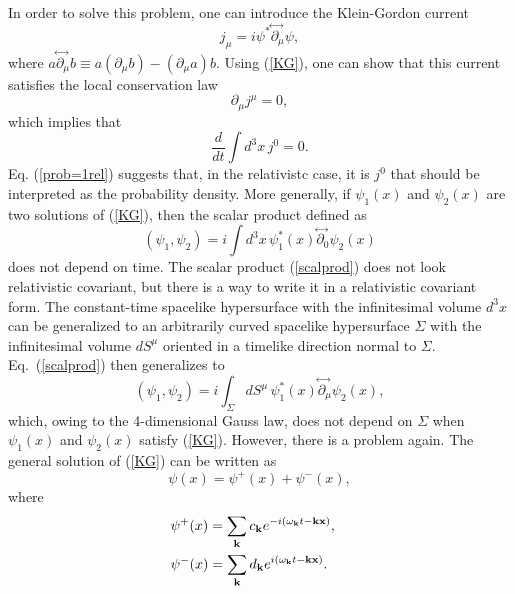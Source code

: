 \documentclass[12pt]{article}
\begin{document}
In order to solve this problem, one can introduce the 
Klein-Gordon current
\begin{equation}\label{cur}
j_{\mu}=i\psi^* \!\stackrel{\leftrightarrow\;}{\partial_{\mu}}\! \psi ,
\end{equation}
where $a \!\stackrel{\leftrightarrow\;}{\partial_{\mu}}\! b \equiv
a(\partial_{\mu}b) -(\partial_{\mu} a)b$.
Using (\ref{KG}), one can show that this current satisfies the 
local conservation law
\begin{equation}
\partial_{\mu}j^{\mu}=0,
\end{equation}     
which implies that
\begin{equation}\label{prob=1rel}
\frac{d}{dt}\int d^3x\, j^0 =0 .
\end{equation}
Eq. (\ref{prob=1rel}) suggests that, in the relativistc case, 
it is $j^0$ that should be interpreted as the probability density.
More generally, if $\psi_1(x)$ and $\psi_2(x)$ are two solutions
of (\ref{KG}), then the scalar product defined as
\begin{equation}\label{scalprod}
(\psi_1,\psi_2)=i\int d^3x \, \psi_1^*(x)
\!\stackrel{\leftrightarrow\;}{\partial_0}\! \psi_2(x) 
\end{equation} 
does not depend on time. The scalar product (\ref{scalprod})
does not look relativistic covariant, but there is a way to 
write it in a relativistic covariant form. The constant-time
spacelike 
hypersurface with the infinitesimal volume $d^3x$ can be generalized
to an arbitrarily curved spacelike hypersurface $\Sigma$ with
the infinitesimal volume $dS^{\mu}$ oriented in a 
timelike direction normal to $\Sigma$. Eq.~(\ref{scalprod})
then generalizes to  
\begin{equation}\label{scalprod2}
(\psi_1,\psi_2)=i\int_{\Sigma} dS^{\mu} \, \psi_1^*(x)
\!\stackrel{\leftrightarrow\;}{\partial_{\mu}}\! \psi_2(x) , 
\end{equation}  
which, owing to the 4-dimensional Gauss law, does not depend on
$\Sigma$ when $\psi_1(x)$ and $\psi_2(x)$ satisfy (\ref{KG}).
However, there is a problem again. The general solution of 
(\ref{KG}) can be written as 
\begin{equation}\label{e48}
\psi(x)=\psi^+(x) + \psi^-(x),
\end{equation}
where
\begin{eqnarray}\label{psi+-}
& \psi^+(x)=
\displaystyle\sum_{{\bf k}} 
c_{{\bf k}} e^{-i(\omega_{{\bf k}}t-{\bf k}{\bf x}) } , &
\\ \nonumber
& \psi^-(x)=
\displaystyle\sum_{{\bf k}} 
d_{{\bf k}} e^{i(\omega_{{\bf k}}t-{\bf k}{\bf x}) } . &
\end{eqnarray} 
\end{document}
